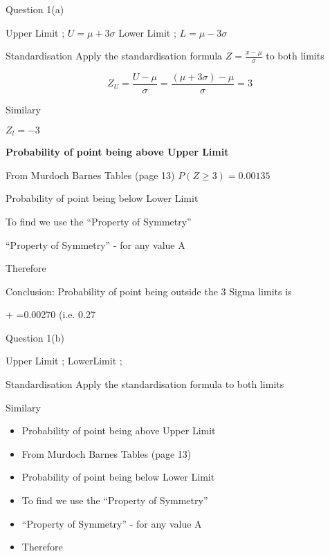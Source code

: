 \documentclass[]{report}
\begin{document}








		





Question 1(a)

Upper Limit ;  $U = \mu + 3 \sigma $
Lower Limit ;  $L = \mu - 3 \sigma $

Standardisation
Apply the standardisation formula	$Z=\frac{x-\mu}{\sigma} $	to both limits

\[ Z_U = \frac{U-\mu}{\sigma} =  \frac{(\mu + 3 \sigma)-\mu}{\sigma} = 3\]

Similary

$Z_l=-3$ 

\noindent \textbf{Probability of point being above Upper Limit}

From Murdoch Barnes Tables (page 13)  $P(Z \geq 3)=0.00135$

Probability of point being below Lower Limit


To find   we use the “Property of Symmetry”

“Property of Symmetry” -   for any value A

Therefore 

Conclusion: 
Probability of point being outside the 3 Sigma limits is

+ =0.00270 	(i.e. 0.27%



Question 1(b)

Upper Limit ;  
LowerLimit ;  

Standardisation
Apply the standardisation formula	 	to both limits


Similary

\begin{itemize}
	\item 		Probability of point being above Upper Limit
	
	\item 	From Murdoch Barnes Tables (page 13)  
	
	\item 	Probability of point being below Lower Limit
	
	
	\item 	To find   we use the “Property of Symmetry”
	
	\item 	“Property of Symmetry” -   for any value A
	
	\item 	Therefore 
\end{itemize}	
\end{document}
